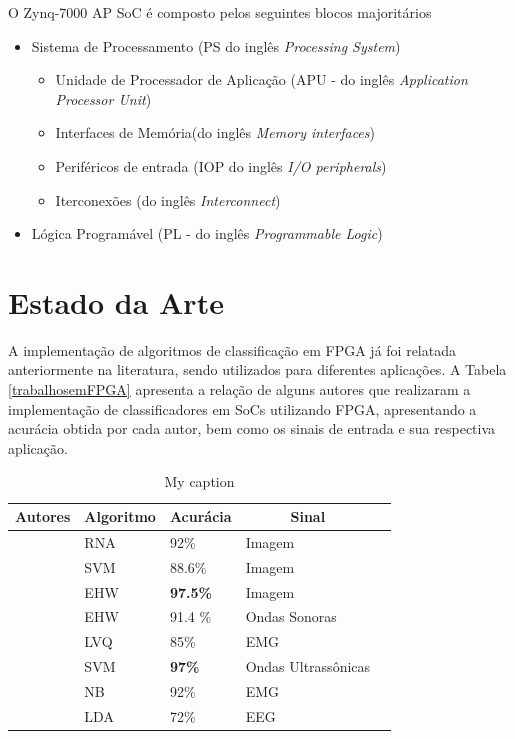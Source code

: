 O Zynq-7000 AP SoC é composto pelos seguintes blocos majoritários
\begin{itemize}
\item Sistema de Processamento (PS do inglês \textit{Processing System})
\begin{itemize}
\item Unidade de Processador de Aplicação (APU - do inglês \textit{Application Processor Unit})
\item  Interfaces de Memória(do inglês \textit{Memory interfaces})
\item  Periféricos de entrada (IOP do inglês \textit{I/O peripherals})
\item Iterconexões (do inglês \textit{Interconnect})
\end{itemize}
\item Lógica Programável (PL - do inglês \textit{Programmable Logic})
\end{itemize}

\section{Estado da Arte}
A implementação de algoritmos de classificação em FPGA já foi relatada anteriormente na literatura, sendo utilizados para diferentes aplicações. A Tabela \ref{trabalhosemFPGA} apresenta a relação de alguns autores que realizaram a implementação de classificadores em SoCs utilizando FPGA, apresentando a acurácia obtida por cada autor, bem como os sinais de entrada e sua respectiva aplicação.

\begin{table}[h!]
	\centering
	\caption{My caption}
	\label{my-label}
	\begin{tabular}{|l|l|l|l|l|}
		\hline
		\multicolumn{1}{|c|}{\textbf{Autores}} & \multicolumn{1}{c|}{\textbf{Algoritmo}} &  \multicolumn{1}{c|}{\textbf{Acurácia}} & \multicolumn{1}{c|}{\textbf{Sinal}} \\ \hline
		\textit{\cite{RNAFPGA}} & RNA & 92\% & Imagem \\ \hline
		\textit{\cite{Irick}} & SVM  & 88.6\% & Imagem \\ \hline
		\textit{\cite{Glette2009}} & EHW  & \textbf{97.5\%} & Imagem \\ \hline
		\textit{\cite{Glette2007}} & EHW & 91.4 \% & Ondas Sonoras \\ \hline
		\textit{\cite{Alkim}} & LVQ & 85\% & EMG \\ \hline
		\textit{\cite{Yuan}} & SVM & \textbf{97\%} & Ondas Ultrassônicas \\ \hline
		\textit{\cite{Chen}} & NB & 92\% & EMG \\ \hline
		\textit{\cite{Kais}} & LDA & 72\% & EEG \\ \hline
	\end{tabular}
\end{table}

